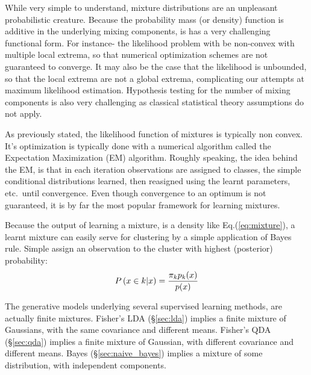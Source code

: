 \begin{remark}
While very simple to understand, mixture distributions are an unpleasant probabilistic creature. 
Because the probability mass (or density) function is additive in the underlying mixing components, is has a very challenging functional form.
For instance- the likelihood problem with be non-convex with multiple local extrema, so that numerical optimization schemes are not guaranteed to converge.
It may also be the case that the likelihood is unbounded, so that the local extrema are not a global extrema, complicating our attempts at maximum likelihood estimation. 
Hypothesis testing for the number of mixing components is also very challenging as classical statistical theory assumptions do not apply.
\end{remark}


\begin{remark}
As previously stated, the likelihood function of mixtures is typically non convex. 
It's optimization is typically done with a numerical algorithm called the Expectation Maximization (EM) algorithm.
Roughly speaking, the idea behind the EM, is that in each iteration observations are assigned to classes, the simple conditional distributions learned, then reasigned using the learnt parameters, etc.\ until convergence.
Even though convergence to an optimum is not guaranteed, it is by far the most popular framework for learning mixtures.
\end{remark}



\begin{remark}
Because the output of learning a mixture, is a density like Eq.(\ref{eq:mixture}), a learnt mixture can easily serve for clustering by a simple application of Bayes rule. Simple assign an observation to the cluster with highest (posterior) probability:
\begin{align}
\label{eq:mixture_posterior}
	P\left( x \in k|x \right)=\frac{\pi_k p_k(x)}{p(x)}
\end{align}
\end{remark}



\begin{remark}
The generative models underlying several supervised learning methods, are actually finite mixtures.
Fisher's LDA (\S\ref{sec:lda}) implies a finite mixture of Gaussians, with the same covariance and different means.
Fisher's QDA (\S\ref{sec:qda}) implies a finite mixture of Gaussian, with different covariance and different means.
\Naive Bayes (\S\ref{sec:naive_bayes}) implies a mixture of some distribution, with independent components.
\end{remark}





